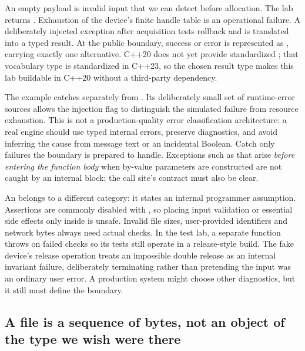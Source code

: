 \hypertarget{01-foundations-i-ch004-which-failures-are-expected-input-which-are-operational-and-which-break-our-program}{}

An empty payload is invalid input that we can detect before allocation. The lab returns . Exhaustion of the device's finite handle table is an operational failure. A deliberately injected exception after acquisition tests rollback and is translated into a typed result. At the public boundary, success or error is represented as , carrying exactly one alternative. C++20 does not yet provide standardized ; that vocabulary type is standardized in C++23, so the chosen result type makes this lab buildable in C++20 without a third-party dependency.

The example catches  separately from . Its deliberately small set of runtime-error sources allows the injection flag to distinguish the simulated failure from resource exhaustion. This is not a production-quality error classification architecture: a real engine should use typed internal errors, preserve diagnostics, and avoid inferring the cause from message text or an incidental Boolean. Catch only failures the boundary is prepared to handle. Exceptions such as  that arise \emph{before entering the function body} when by-value parameters are constructed are not caught by an internal  block; the call site's contract must also be clear.

An  belongs to a different category: it states an internal programmer assumption. Assertions are commonly disabled with , so placing input validation or essential side effects only inside  is unsafe. Invalid file sizes, user-provided identifiers and network bytes always need actual checks. In the test lab, a separate  function throws on failed checks so its tests still operate in a release-style  build. The fake device's release operation treats an impossible double release as an internal invariant failure, deliberately terminating rather than pretending the input was an ordinary user error. A production system might choose other diagnostics, but it still must define the boundary.

\subsection{A file is a sequence of bytes, not an object of the type we wish were there}\label{01-foundations-i-ch004-a-file-is-a-sequence-of-bytes-not-an-object-of-the-type-we-wish-were-there}


